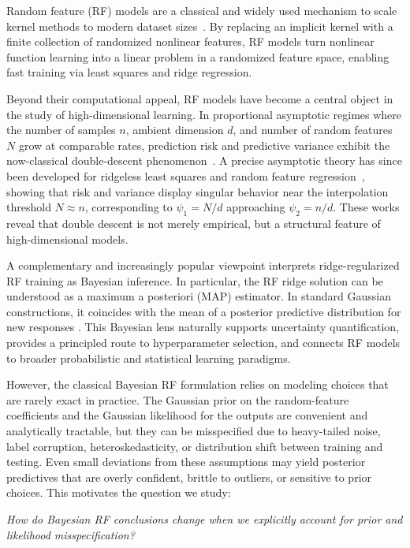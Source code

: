 \documentclass[12pt, english, oneside, a4paper]{article}
\begin{document}
Random feature (RF) models are a classical and widely used mechanism to scale kernel methods to modern dataset sizes~\citep{rahimi2007random}. 
By replacing an implicit kernel with a finite collection of randomized nonlinear features, RF models turn nonlinear function learning into a linear problem in a randomized feature space, enabling fast training via least squares and ridge regression. 

Beyond their computational appeal, RF models have become a central object in the study of high-dimensional learning. In proportional asymptotic regimes where the number of samples $n$, ambient dimension $d$, and number of random features $N$ grow at comparable rates, prediction risk and predictive variance exhibit the now-classical double-descent phenomenon~\citep{belkin2019reconciling}. 
A precise asymptotic theory has since been developed for ridgeless least squares and random feature regression~\citep{mei2019generalization,hastie2022surprises}, showing that risk and variance display singular behavior near the interpolation threshold $N \approx n$, corresponding to $\psi_1 = N/d$ approaching $\psi_2 = n/d$. 
These works reveal that double descent is not merely empirical, but a structural feature of high-dimensional models.

A complementary and increasingly popular viewpoint interprets ridge-regularized RF training as Bayesian inference. In particular, the RF ridge solution can be understood as a maximum a posteriori (MAP) estimator. In standard Gaussian constructions, it coincides with the mean of a posterior predictive distribution for new responses \citep[Section~2.2]{baek2023asymptotics}. This Bayesian lens naturally supports uncertainty quantification, provides a principled route to hyperparameter selection, and connects RF models to broader probabilistic and statistical learning paradigms.

However, the classical Bayesian RF formulation relies on modeling choices that are rarely exact in practice. The Gaussian prior on the random-feature coefficients and the Gaussian likelihood for the outputs are convenient and analytically tractable, but they can be misspecified due to heavy-tailed noise, label corruption, heteroskedasticity, or distribution shift between training and testing. Even small deviations from these assumptions may yield posterior predictives that are overly confident, brittle to outliers, or sensitive to prior choices. This motivates the question we study:

\emph{How do Bayesian RF conclusions change when we explicitly account for prior and likelihood misspecification?}
\end{document}
